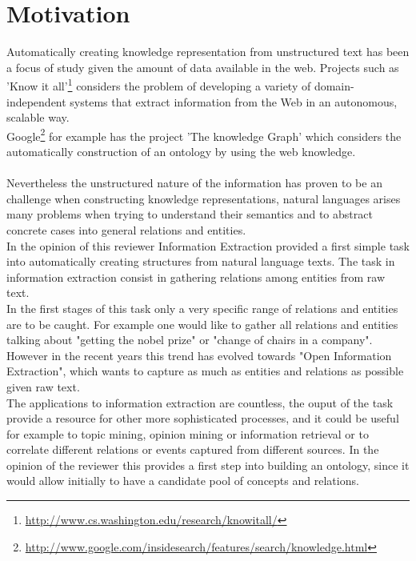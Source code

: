 \documentclass[4pt,a4paper,twocolumn]{article}
\begin{document}
\section{Motivation}

Automatically creating knowledge representation from unstructured text has been a focus of study given the amount of data available in the web.
Projects such as 'Know it all'\footnote{\url{http://www.cs.washington.edu/research/knowitall/}} considers the problem of developing a variety of domain-independent systems that extract information from the Web in an autonomous, scalable way.\\ Google\footnote{\url{http://www.google.com/insidesearch/features/search/knowledge.html}} for example has the project 'The knowledge Graph' which considers the automatically construction of an ontology by using the web knowledge. \\
\\
Nevertheless the unstructured nature of the information has proven to be an challenge when constructing knowledge representations, natural languages arises many problems when trying to understand their semantics and to abstract concrete cases into general relations and entities.\\
In the opinion of this reviewer Information Extraction provided a first simple task into automatically creating structures from natural language texts. The task in information extraction consist in gathering  relations among entities from raw text.\\
In the first stages of this task only a very specific range of relations and entities are to be caught.
For example one would like to gather all relations and entities talking about  "getting the nobel prize" or "change of chairs in a company".\\
However in the recent years this trend has evolved towards "Open Information Extraction", which wants to capture as much as entities and relations as possible given raw text.\\
The applications to information extraction are countless, the ouput of the task provide a resource for other more sophisticated processes, and it could be useful for example to topic mining, opinion mining or information retrieval or to correlate different relations or events captured from different sources.
In the opinion of the reviewer this provides a first step into building an ontology, since it would allow initially to have a candidate pool of concepts and relations.\\
\end{document}

